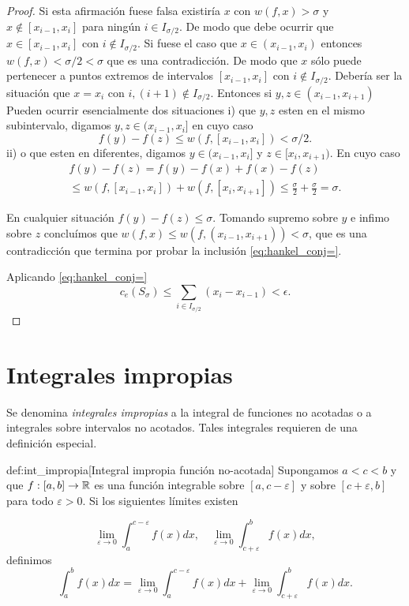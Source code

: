 \begin{proof}
Si esta afirmación fuese falsa existiría $x$ con $w(f,x)>\sigma$ y $x\notin [x_{i-1},x_i]$ para ningún $i\in I_{\sigma/2}$. De modo que debe ocurrir que $x\in   [x_{i-1},x_i]$ con $i\notin I_{\sigma/2}$. Si fuese el caso que  $x\in   (x_{i-1},x_i)$ entonces  $w(f,x)<\sigma/2<\sigma$ que es una contradicción. De modo que $x$ sólo puede pertenecer a puntos extremos de intervalos  $[x_{i-1},x_i]$ con  $i\notin I_{\sigma/2}$. Debería ser la situación que $x=x_i$ con $i,(i+1)\notin I_{\sigma/2}$. Entonces si $y,z  \in (x_{i-1},x_{i+1})$ Pueden ocurrir esencialmente dos situaciones i) que $y,z$ esten en el mismo subintervalo, digamos  $y,z \in (x_{i-1},x_{i}]$ en cuyo caso
\[
 f(y)-f(z)\leq w(f, [x_{i-1},x_{i}])<\sigma/2.
\]
ii) o que esten en diferentes, digamos $y\in  (x_{i-1},x_{i}]$ y $z \in [x_{i},x_{i+1})$. En cuyo caso
\begin{multline*}
 f(y)-f(z)=f(y)-f(x)+f(x)-f(z)\\
 \leq w(f,[x_{i-1},x_i])+w(f,[x_{i},x_{i+1}])\leq\frac{\sigma}{2}+\frac{\sigma}{2}=\sigma.
\end{multline*}

En cualquier situación $f(y)-f(z)\leq\sigma$. Tomando supremo sobre $y$ e infimo sobre $z$ concluímos que $w(f,x)\leq w(f,(x_{i-1},x_{i+1}))<\sigma$, que es una contradicción que termina por probar la inclusión  \eqref{eq:hankel_conj=}. 

Aplicando \eqref{eq:hankel_conj=}
\[
 c_e(S_{\sigma})\leq  \sum_{i\in I_{\sigma/2}}(x_i-x_{i-1})<\epsilon.
\] 
\end{proof}

   
   
\section{Integrales impropias}
Se denomina \emph{integrales impropias} a la integral de funciones no acotadas o a integrales sobre intervalos no acotados. Tales integrales requieren de una definición especial.
\begin{definicion}{def:int_impropia}[Integral impropia función no-acotada] Supongamos $a<c<b$ y que $f:[a,b]\to\mathbb{R}$ es una función integrable sobre $[a,c-\varepsilon]$ y sobre $[c+\varepsilon,b]$ para todo $\varepsilon>0$. Si los siguientes límites existen

\[
 \lim_{\varepsilon\to 0}\int_a^{c-\varepsilon}f(x)dx,\quad \lim_{\varepsilon\to 0}\int_{c+\varepsilon}^bf(x)dx,
\]
definimos 
\begin{equation}\label{eq:int_impro}
 \int_a^bf(x)dx= \lim_{\varepsilon\to 0}\int_a^{c-\varepsilon}f(x)dx+ \lim_{\varepsilon\to 0}\int_{c+\varepsilon}^bf(x)dx.
\end{equation}



 
\end{definicion}

